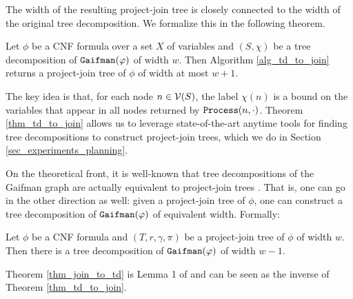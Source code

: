 The width of the resulting project-join tree is closely connected to the width of the original tree decomposition.
We formalize this in the following theorem.
\begin{theorem}
\label{thm_td_to_join}
	Let $\phi$ be a CNF formula over a set $X$ of variables and $(S, \chi)$ be a tree decomposition of $\texttt{\upshape Gaifman}(\varphi)$ of width $w$.
    Then Algorithm \ref{alg_td_to_join} returns a project-join tree of $\phi$ of width at most $w+1$.
\end{theorem}
The key idea is that, for each node $n \in \mathcal{V}(S)$, the label $\chi(n)$ is a bound on the variables that appear in all nodes returned by $\texttt{\upshape Process}(n, \cdot)$.
Theorem \ref{thm_td_to_join} allows us to leverage state-of-the-art anytime tools for finding tree decompositions \cite{tamaki2019positive,strasser2017computing,abseher2017htd} to construct project-join trees, which we do in Section \ref{sec_experiments_planning}.

On the theoretical front, it is well-known that tree decompositions of the Gaifman graph are actually equivalent to project-join trees \cite{mcmahan2004projection}.
That is, one can go in the other direction as well: given a project-join tree of $\phi$, one can construct a tree decomposition of $\texttt{\upshape Gaifman}(\varphi)$ of equivalent width.
Formally:
\begin{theorem}
\label{thm_join_to_td}
    Let $\phi$ be a CNF formula and $(T, r, \gamma, \pi)$ be a project-join tree of $\phi$ of width $w$.
    Then there is a tree decomposition of $\texttt{\upshape Gaifman}(\varphi)$ of width $w-1$.
\end{theorem}
Theorem \ref{thm_join_to_td} is Lemma 1 of \cite{mcmahan2004projection} and can be seen as the inverse of Theorem \ref{thm_td_to_join}.
